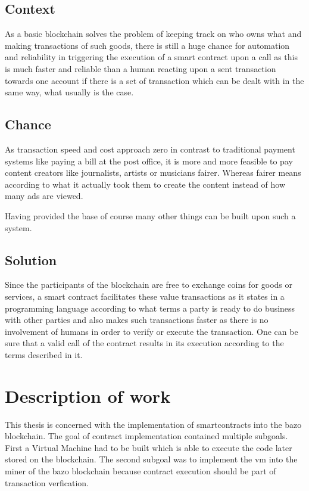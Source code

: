 \subsection{Context}
As a basic blockchain solves the problem of keeping track on who owns what and making transactions of such goods, there is still a huge chance for automation and reliability in triggering the execution of a smart contract upon a call as this is much faster and reliable than a human reacting upon a sent transaction towards one account if there is a set of transaction which can be dealt with in the same way, what usually is the case. 

\subsection{Chance}
As transaction speed and cost approach zero in contrast to traditional payment systems like paying a bill at the post office, it is more and more feasible to pay content creators like journalists, artists or musicians fairer. Whereas fairer means according to what it actually took them to create the content instead of how many ads are viewed.

Having provided the base of course many other things can be built upon such a system.

\subsection{Solution}
Since the participants of the blockchain are free to exchange coins for goods or services, a smart contract facilitates these value transactions as it states in a programming language according to what terms a party is ready to do business with other parties and also makes such transactions faster as there is no involvement of humans in order to verify or execute the transaction. One can be sure that a valid call of the contract results in its execution according to the terms described in it.

\section{Description of work}
This thesis is concerned with the implementation of smartcontracts into the bazo blockchain. The goal of contract implementation contained multiple subgoals. First a Virtual Machine had to be built which is able to execute the code later stored on the blockchain. The second subgoal was to implement the vm into the miner of the bazo blockchain because contract execution should be part of transaction verfication.